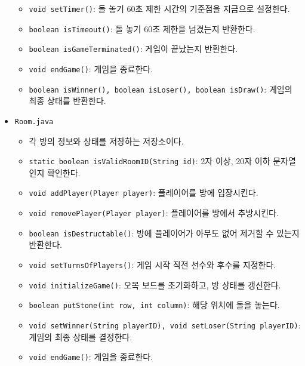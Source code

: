 \documentclass[a4paper, 10pt]{article}
\begin{document}
\begin{itemize}
\begin{itemize}
    \item \texttt{void setTimer()}: 돌 놓기 60초 제한 시간의 기준점을 지금으로 설정한다.
    \item \texttt{boolean isTimeout()}: 돌 놓기 60초 제한을 넘겼는지 반환한다.
    \item \texttt{boolean isGameTerminated()}: 게임이 끝났는지 반환한다.
    \item \texttt{void endGame()}: 게임을 종료한다.
    \item \texttt{boolean isWinner(), boolean isLoser(), boolean isDraw()}: 게임의 최종 상태를 반환한다.
  \end{itemize}
  \item \texttt{Room.java}
  \begin{itemize}
    \item[] 각 방의 정보와 상태를 저장하는 저장소이다.
    \item \texttt{static boolean isValidRoomID(String id)}: 2자 이상, 20자 이하 문자열인지 확인한다.
    \item \texttt{void addPlayer(Player player)}: 플레이어를 방에 입장시킨다.
    \item \texttt{void removePlayer(Player player)}: 플레이어를 방에서 추방시킨다.
    \item \texttt{boolean isDestructable()}: 방에 플레이어가 아무도 없어 제거할 수 있는지 반환한다.
    \item \texttt{void setTurnsOfPlayers()}: 게임 시작 직전 선수와 후수를 지정한다.
    \item \texttt{void initializeGame()}: 오목 보드를 초기화하고, 방 상태를 갱신한다.
    \item \texttt{boolean putStone(int row, int column)}: 해당 위치에 돌을 놓는다.
    \item \texttt{void setWinner(String playerID), void setLoser(String playerID)}: 게임의 최종 상태를 결정한다.
    \item \texttt{void endGame()}: 게임을 종료한다.
  \end{itemize}
\end{itemize}
\end{document}
